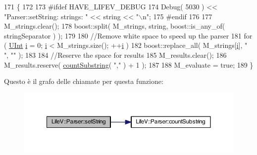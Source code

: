 \begin{DoxyCode}
171 \{
172 
173 \textcolor{preprocessor}{#ifdef HAVE\_LIFEV\_DEBUG}
174 \textcolor{preprocessor}{}    Debug( 5030 ) << \textcolor{stringliteral}{"Parser::setString:          strings: "} << \textcolor{keywordtype}{string} << \textcolor{stringliteral}{"\(\backslash\)n"};
175 \textcolor{preprocessor}{#endif}
176 \textcolor{preprocessor}{}
177     M\_strings.clear();
178     boost::split( M\_strings, \textcolor{keywordtype}{string}, boost::is\_any\_of( stringSeparator ) );
179 
180     \textcolor{comment}{//Remove white space to speed up the parser}
181     \textcolor{keywordflow}{for} ( \hyperlink{namespaceLifeV_a4bd093cf6b0d5b57b2d89e0e90d610b7}{UInt} \hyperlink{matrici_8m_a6f6ccfcf58b31cb6412107d9d5281426}{i} = 0; \hyperlink{matrici_8m_a6f6ccfcf58b31cb6412107d9d5281426}{i} < M\_strings.size(); ++\hyperlink{matrici_8m_a6f6ccfcf58b31cb6412107d9d5281426}{i} )
182         boost::replace\_all( M\_strings[\hyperlink{matrici_8m_a6f6ccfcf58b31cb6412107d9d5281426}{i}], \textcolor{stringliteral}{" "}, \textcolor{stringliteral}{""} );
183 
184     \textcolor{comment}{//Reserve the space for results}
185     M\_results.clear();
186     M\_results.reserve( \hyperlink{classLifeV_1_1Parser_a37ae3af9abcf72ca8e1537ec771b523a}{countSubstring}( \textcolor{stringliteral}{","} ) + 1 );
187 
188     M\_evaluate = \textcolor{keyword}{true};
189 \}
\end{DoxyCode}


Questo è il grafo delle chiamate per questa funzione\-:\nopagebreak
\begin{figure}[H]
\begin{center}
\leavevmode
\includegraphics[width=350pt]{classLifeV_1_1Parser_ac05769e836a0dc95d9c020df361a5194_cgraph}
\end{center}
\end{figure}




